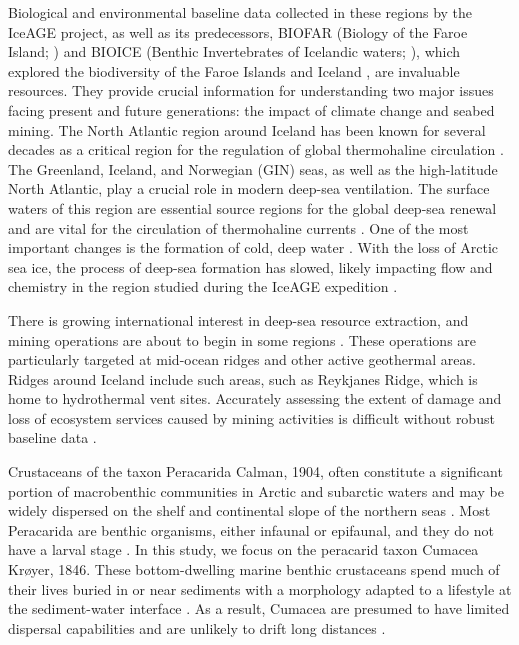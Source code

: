 Biological and environmental baseline data collected in these regions by the IceAGE project, as well as its predecessors, BIOFAR (Biology of the Faroe Island; \citep{norrevang1994list, gerken1999cumacea}) and BIOICE (Benthic Invertebrates of Icelandic waters; \citep{omarsdottir2013biodiversity}), which explored the biodiversity of the Faroe Islands and Iceland \citep{meissner2018preface}, are invaluable resources. They provide crucial information for understanding two major issues facing present and future generations: the impact of climate change and seabed mining. The North Atlantic region around Iceland has been known for several decades as a critical region for the regulation of global thermohaline circulation \citep{meissner2018preface}. The Greenland, Iceland, and Norwegian (GIN) seas, as well as the high-latitude North Atlantic, play a crucial role in modern deep-sea ventilation. The surface waters of this region are essential source regions for the global deep-sea renewal and are vital for the circulation of thermohaline currents \citep{johannessen1994relationship}. One of the most important changes is the formation of cold, deep water \citep{lohmann1998sea, meehl2007global, winton1997effect}. With the loss of Arctic sea ice, the process of deep-sea formation has slowed, likely impacting flow and chemistry in the region studied during the IceAGE expedition \citep{meissner2018preface}.

There is growing international interest in deep-sea resource extraction, and mining operations are about to begin in some regions \citep{halfar2007danger, mengerink2014call, nath2000environment}. These operations are particularly targeted at mid-ocean ridges and other active geothermal areas. Ridges around Iceland include such areas, such as Reykjanes Ridge, which is home to hydrothermal vent sites. Accurately assessing the extent of damage and loss of ecosystem services caused by mining activities is difficult without robust baseline data \citep{meissner2018preface}.

Crustaceans of the taxon Peracarida Calman, 1904, often constitute a significant portion of macrobenthic communities in Arctic and subarctic waters \citep{brandt1997biodiversity, conlan2008distribution, stransky2010diversity} and may be widely dispersed on the shelf and continental slope of the northern seas \citep{hansen1916crustacea, just1980amphipoda, svavarsson1990distribution, svavarsson1993deep, brandt1995peracarid, brandt1996species}. Most Peracarida are benthic organisms, either infaunal or epifaunal, and they do not have a larval stage \citep{hessler1989behavior, dauvin1996suprabenthic}. In this study, we focus on the peracarid taxon Cumacea Krøyer, 1846. These bottom-dwelling marine benthic crustaceans spend much of their lives buried in or near sediments with a morphology adapted to a lifestyle at the sediment-water interface \citep{uhlir2021adding}. As a result, Cumacea are presumed to have limited dispersal capabilities and are unlikely to drift long distances \citep{rex1981community, wilson1987speciation}.

